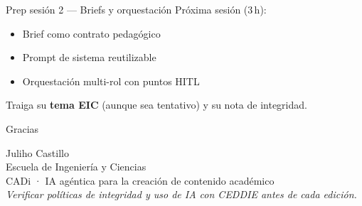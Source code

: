 \documentclass[aspectratio=169,11pt]{beamer}
\begin{document}
\begin{frame}{Prep sesión 2 --- Briefs y orquestación}
Próxima sesión (3\,h):
\begin{itemize}
\item Brief como contrato pedagógico
\item Prompt de sistema reutilizable
\item Orquestación multi-rol con puntos HITL
\end{itemize}
Traiga su \textbf{tema EIC} (aunque sea tentativo) y su nota de integridad.
\end{frame}

\begin{frame}{Gracias}
\begin{center}
{\Large Juliho Castillo}\\[0.5em]
Escuela de Ingeniería y Ciencias\\[1em]
CADi · IA agéntica para la creación de contenido académico\\[1.5em]
{\small \emph{Verificar políticas de integridad y uso de IA con CEDDIE antes de cada edición.}}
\end{center}
\end{frame}
\end{document}
